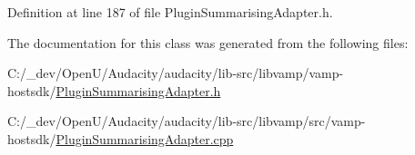 Definition at line 187 of file Plugin\+Summarising\+Adapter.\+h.



The documentation for this class was generated from the following files\+:\begin{DoxyCompactItemize}
\item 
C\+:/\+\_\+dev/\+Open\+U/\+Audacity/audacity/lib-\/src/libvamp/vamp-\/hostsdk/\hyperlink{_plugin_summarising_adapter_8h}{Plugin\+Summarising\+Adapter.\+h}\item 
C\+:/\+\_\+dev/\+Open\+U/\+Audacity/audacity/lib-\/src/libvamp/src/vamp-\/hostsdk/\hyperlink{_plugin_summarising_adapter_8cpp}{Plugin\+Summarising\+Adapter.\+cpp}\end{DoxyCompactItemize}
